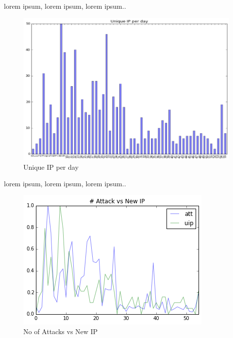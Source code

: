\documentclass{article}
\begin{document}
lorem ipsum, lorem ipsum, lorem ipsum..

\begin{figure}[h]
\caption{Unique IP per day}
\centering
\includegraphics[width=0.7\linewidth]{uni_ip_day}
\end{figure}

lorem ipsum, lorem ipsum, lorem ipsum..

\begin{figure}[h]
\caption{No of Attacks vs New IP }
\centering
\includegraphics[width=0.7\linewidth]{h5}
\end{figure}
\end{document}
